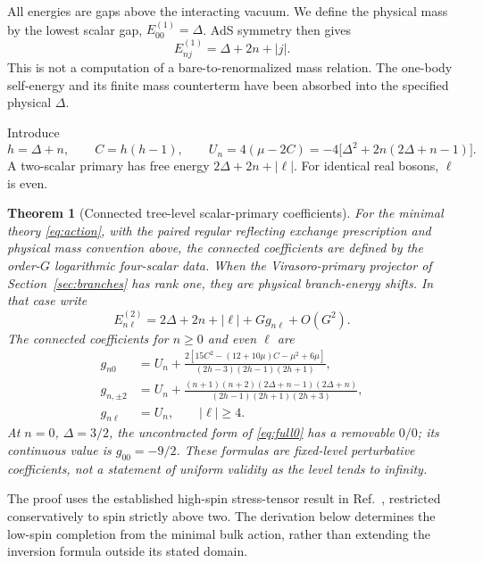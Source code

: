 \documentclass[11pt,a4paper]{article}
\numberwithin{equation}{section}
\newtheorem{theorem}{Theorem}[section]
\theoremstyle{remark}\newtheorem{remark}[theorem]{Remark}
\begin{document}
All energies are gaps above the interacting vacuum. We define the physical mass by the lowest scalar gap, $E^{(1)}_{00}=\Delta$. AdS symmetry then gives
\begin{equation}
 E^{(1)}_{nj}=\Delta+2n+|j|.
 \label{eq:oneparticle}
\end{equation}
This is not a computation of a bare-to-renormalized mass relation. The one-body self-energy and its finite mass counterterm have been absorbed into the specified physical $\Delta$.

Introduce
\begin{equation}
 h=\Delta+n,\qquad C=h(h-1),\qquad
 U_n=4(\mu-2C)=-4\bigl[\Delta^2+2n(2\Delta+n-1)\bigr].
 \label{eq:U}
\end{equation}
A two-scalar primary has free energy $2\Delta+2n+|\ell|$. For identical real bosons, $\ell$ is even.

\begin{theorem}[Connected tree-level scalar-primary coefficients]
\label{thm:main}
For the minimal theory \eqref{eq:action}, with the paired regular reflecting exchange prescription and physical mass convention above, the connected coefficients are defined by the order-$G$ logarithmic four-scalar data. When the Virasoro-primary projector of Section~\ref{sec:branches} has rank one, they are physical branch-energy shifts. In that case write
\begin{equation}
 E^{(2)}_{n\ell}=2\Delta+2n+|\ell|+Gg_{n\ell}+O(G^2).
\end{equation}
The connected coefficients for $n\geq0$ and even $\ell$ are
\begin{align}
 g_{n0}&=U_n+
 \frac{2\left[15C^2-(12+10\mu)C-\mu^2+6\mu\right]}
 {(2h-3)(2h-1)(2h+1)},\label{eq:full0}\\
 g_{n,\pm2}&=U_n+
 \frac{(n+1)(n+2)(2\Delta+n-1)(2\Delta+n)}
 {(2h-1)(2h+1)(2h+3)},\label{eq:full2}\\
 g_{n\ell}&=U_n,\qquad |\ell|\geq4.\label{eq:fullhigh}
\end{align}
At $n=0$, $\Delta=3/2$, the uncontracted form of \eqref{eq:full0} has a removable $0/0$; its continuous value is $g_{00}=-9/2$. These formulas are fixed-level perturbative coefficients, not a statement of uniform validity as the level tends to infinity.
\end{theorem}

The proof uses the established high-spin stress-tensor result in Ref.~\cite{KSS}, restricted conservatively to spin strictly above two. The derivation below determines the low-spin completion from the minimal bulk action, rather than extending the inversion formula outside its stated domain.
\end{document}
